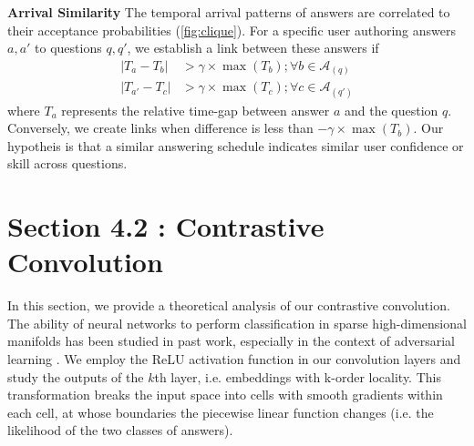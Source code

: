 \documentclass[smallcondensed]{svjour3}     %
\begin{document}
\textbf{Arrival Similarity}
The temporal arrival patterns of answers are correlated to their acceptance probabilities (\cref{fig:clique}). For a specific user authoring answers $a, a'$ to questions $q, q'$, we establish a link between these answers if %
\begin{align*}
 \lvert T_{a} - T_{b} \rvert &> \gamma \times \max(T_{b}); \forall b \in \mathcal{A}_(q) \\
 \lvert T_{a'} - T_{c} \rvert &> \gamma \times \max(T_{c}); \forall c \in \mathcal{A}_(q')
\end{align*}
where $T_{a}$ represents the relative time-gap between answer $a$ and the question $q$. Conversely, we create links when difference is less than $-\gamma \times \max(T_{b})$.
Our hypotheis is that a similar answering schedule indicates similar user confidence or skill across questions.

\section{Section 4.2 : Contrastive Convolution}
\label{ref:analysis}
In this section, we provide a theoretical analysis of our contrastive convolution.
The ability of neural networks to perform classification in sparse high-dimensional manifolds has been studied in past work, especially in the context of adversarial learning \cite{lu2017safetynet}. We employ the ReLU activation function in our convolution layers and study the outputs of the $k$th layer, i.e. embeddings with k-order locality. This transformation breaks the input space into cells with smooth gradients within each cell, at whose boundaries the piecewise linear function changes (i.e. the likelihood of the two classes of answers).

\end{document}
